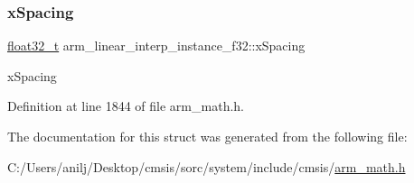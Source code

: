 \subsubsection{\texorpdfstring{x\+Spacing}{xSpacing}}
{\footnotesize\ttfamily \hyperlink{arm__math_8h_a4611b605e45ab401f02cab15c5e38715}{float32\+\_\+t} arm\+\_\+linear\+\_\+interp\+\_\+instance\+\_\+f32\+::x\+Spacing}

x\+Spacing 

Definition at line 1844 of file arm\+\_\+math.\+h.



The documentation for this struct was generated from the following file\+:\begin{DoxyCompactItemize}
\item 
C\+:/\+Users/anilj/\+Desktop/cmsis/sorc/system/include/cmsis/\hyperlink{arm__math_8h}{arm\+\_\+math.\+h}\end{DoxyCompactItemize}
